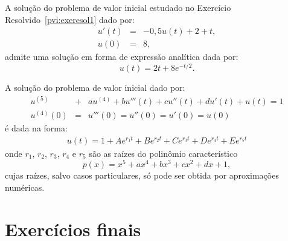 \begin{ex} A solução do problema de valor inicial estudado no Exercício Resolvido~\ref{pvi:exeresol1} dado por:
\begin{eqnarray*}
     u'(t)&=& -0,5u(t)+2+t,\\
            u(0) &=&  8,
\end{eqnarray*}
admite uma solução em forma de expressão analítica dada por:
\begin{equation*}
     u(t) = 2t+8e^{-t/2}. 
\end{equation*} 
\end{ex}

\begin{ex} A solução do problema de valor inicial dado por:
\begin{eqnarray*}
u^{(5)}&+&au^{(4)}+bu'''(t)+cu''(t)+du'(t)+u(t)=1\\
u^{(4)}(0)&=&u'''(0)=u''(0)=u'(0)=u(0)
\end{eqnarray*}
é dada na forma:
\begin{eqnarray*}
u(t)=1+Ae^{r_1 t} + Be^{r_2 t} + Ce^{r_3 t} + De^{r_4 t} + Ee^{r_5 t} 
\end{eqnarray*}
onde $r_1$, $r_2$, $r_3$, $r_4$ e $r_5$ são as raízes do polinômio característico $$p(x)=x^5+ax^4+bx^3+cx^2+dx+1,$$
cujas raízes, salvo casos particulares, só pode ser obtida por aproximações numéricas.
 \end{ex}


\section*{Exercícios finais}


